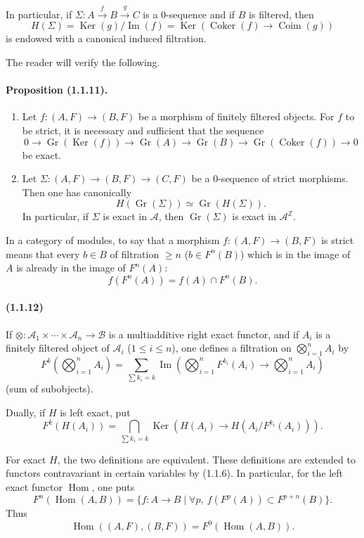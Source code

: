 \documentclass[10pt]{article}
\newcommand{\Z}{\mathbb Z}
\newcommand{\Gr}{\operatorname{Gr}}
\newcommand{\Ker}{\operatorname{Ker}}
\newcommand{\Coker}{\operatorname{Coker}}
\newcommand{\Coim}{\operatorname{Coim}}
\newcommand{\Imop}{\operatorname{Im}}
\newcommand{\Hom}{\operatorname{Hom}}
\newcommand{\calA}{\mathcal A}
\newcommand{\calB}{\mathcal B}
\begin{document}
In particular, if $\Sigma:A\xrightarrow{f}B\xrightarrow{g}C$ is a $0$-sequence and if $B$ is filtered, then
\[
H(\Sigma)=\Ker(g)/\Imop(f)=\Ker(\Coker(f)\to\Coim(g))
\]
is endowed with a canonical induced filtration.

The reader will verify the following.

\paragraph{Proposition (1.1.11).} \begin{enumerate}[label=(\roman*)]
\item Let $f:(A,F)\to(B,F)$ be a morphism of finitely filtered objects. For $f$ to be strict, it is necessary and sufficient that the sequence
\[
0\to\Gr(\Ker(f))\to\Gr(A)\to\Gr(B)\to\Gr(\Coker(f))\to0
\]
be exact.
\item Let $\Sigma:(A,F)\to(B,F)\to(C,F)$ be a $0$-sequence of strict morphisms. Then one has canonically
\[
H(\Gr(\Sigma))\simeq\Gr(H(\Sigma)).
\]
In particular, if $\Sigma$ is exact in $\calA$, then $\Gr(\Sigma)$ is exact in $\calA^{\Z}$.
\end{enumerate}

In a category of modules, to say that a morphism $f:(A,F)\to(B,F)$ is strict means that every $b\in B$ of filtration $\ge n$ ($b\in F^n(B)$) which is in the image of $A$ is already in the image of $F^n(A)$:
\[
f(F^n(A))=f(A)\cap F^n(B).
\]

\paragraph{(1.1.12)} If $\otimes:\calA_1\times\cdots\times\calA_n\to\calB$ is a multiadditive right exact functor, and if $A_i$ is a finitely filtered object of $\calA_i$ ($1\le i\le n$), one defines a filtration on $\bigotimes_{i=1}^nA_i$ by
\[
F^k\left(\bigotimes_{i=1}^n A_i\right)=\sum_{\sum k_i=k}\Imop\left(\bigotimes_{i=1}^n F^{k_i}(A_i)\to\bigotimes_{i=1}^n A_i\right)
\]
(sum of subobjects).

Dually, if $H$ is left exact, put
\[
F^k(H(A_i))=\bigcap_{\sum k_i=k}\Ker\left(H(A_i)\to H(A_i/F^{k_i}(A_i))\right).
\]

For exact $H$, the two definitions are equivalent. These definitions are extended to functors contravariant in certain variables by (1.1.6). In particular, for the left exact functor $\Hom$, one puts
\[
F^n(\Hom(A,B))=\{f:A\to B\mid \forall p,\ f(F^p(A))\subset F^{p+n}(B)\}.
\]
Thus
\[
\Hom((A,F),(B,F))=F^0(\Hom(A,B)).
\]
\end{document}

